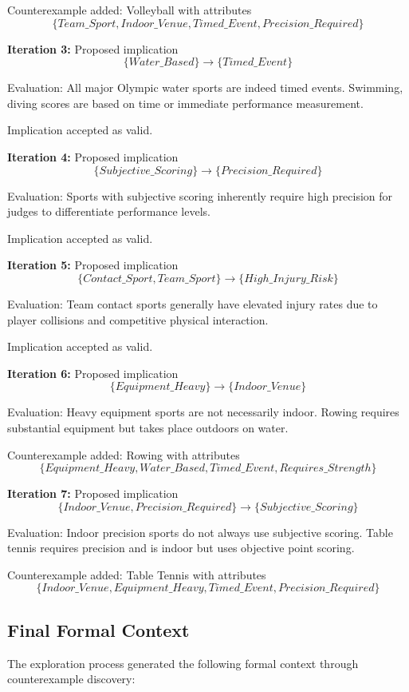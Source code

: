 \documentclass{article}
\begin{document}
Counterexample added: Volleyball with attributes $$\{Team\_Sport, Indoor\_Venue, Timed\_Event, Precision\_Required\}$$

\textbf{Iteration 3:} Proposed implication $$\{Water\_Based\} \rightarrow \{Timed\_Event\}$$

Evaluation: All major Olympic water sports are indeed timed events. Swimming, diving scores are based on time or immediate performance measurement.

Implication accepted as valid.

\textbf{Iteration 4:} Proposed implication $$\{Subjective\_Scoring\} \rightarrow \{Precision\_Required\}$$

Evaluation: Sports with subjective scoring inherently require high precision for judges to differentiate performance levels.

Implication accepted as valid.

\textbf{Iteration 5:} Proposed implication $$\{Contact\_Sport, Team\_Sport\} \rightarrow \{High\_Injury\_Risk\}$$

Evaluation: Team contact sports generally have elevated injury rates due to player collisions and competitive physical interaction.

Implication accepted as valid.

\textbf{Iteration 6:} Proposed implication $$\{Equipment\_Heavy\} \rightarrow \{Indoor\_Venue\}$$

Evaluation: Heavy equipment sports are not necessarily indoor. Rowing requires substantial equipment but takes place outdoors on water.

Counterexample added: Rowing with attributes $$\{Equipment\_Heavy, Water\_Based, Timed\_Event, Requires\_Strength\}$$

\textbf{Iteration 7:} Proposed implication $$\{Indoor\_Venue, Precision\_Required\} \rightarrow \{Subjective\_Scoring\}$$

Evaluation: Indoor precision sports do not always use subjective scoring. Table tennis requires precision and is indoor but uses objective point scoring.

Counterexample added: Table Tennis with attributes $$\{Indoor\_Venue, Equipment\_Heavy, Timed\_Event, Precision\_Required\}$$

\subsection*{Final Formal Context}

The exploration process generated the following formal context through counterexample discovery:
\end{document}
